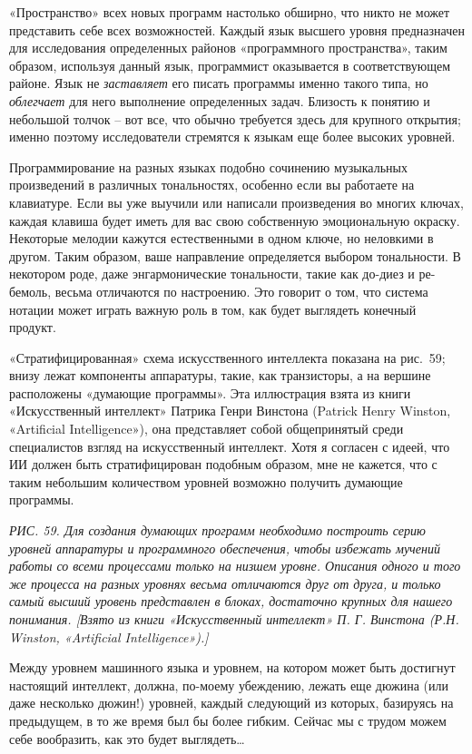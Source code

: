 \documentclass[../main.tex]{subfiles}
\begin{document}
«Пространство» всех новых программ настолько обширно, что никто не может представить себе всех возможностей. Каждый язык высшего уровня предназначен для исследования определенных районов «программного пространства», таким образом, используя данный язык, программист оказывается в соответствующем районе. Язык не \emph{заставляет} его писать программы именно такого типа, но \emph{облегчает} для него выполнение определенных задач. Близость к понятию и небольшой толчок \--- вот все, что обычно требуется здесь для крупного открытия; именно поэтому исследователи стремятся к языкам еще более высоких уровней.

Программирование на разных языках подобно сочинению музыкальных произведений в различных тональностях, особенно если вы работаете на клавиатуре. Если вы уже выучили или написали произведения во многих ключах, каждая клавиша будет иметь для вас свою собственную эмоциональную окраску. Некоторые мелодии кажутся естественными в одном ключе, но неловкими в другом. Таким образом, ваше направление определяется выбором тональности. В некотором роде, даже энгармонические тональности, такие как до-диез и ре-бемоль, весьма отличаются по настроению. Это говорит о том, что система нотации может играть важную роль в том, как будет выглядеть конечный продукт.

«Стратифицированная» схема искусственного интеллекта показана на рис.~59; внизу лежат компоненты аппаратуры, такие, как транзисторы, а на вершине расположены «думающие программы». Эта иллюстрация взята из книги «Искусственный интеллект» Патрика Генри Винстона (Patrick Henry Winston, «Artificial Intelligence»), она представляет собой общепринятый среди специалистов взгляд на искусственный интеллект. Хотя я согласен с идеей, что ИИ должен быть стратифицирован подобным образом, мне не кажется, что с таким небольшим количеством уровней возможно получить думающие программы.

\emph{РИС. 59. Для создания думающих программ необходимо построить серию уровней аппаратуры и программного обеспечения, чтобы избежать мучений работы со всеми процессами только на низшем уровне. Описания одного и того же процесса на разных уровнях весьма отличаются друг от друга, и только самый высший уровень представлен в блоках, достаточно крупных для нашего понимания. {[}Взято из книги «Искусственный интеллект» П. Г. Винстона (Р.Н. Winston, «Artificial Intelligence»).{]}}

Между уровнем машинного языка и уровнем, на котором может быть достигнут настоящий интеллект, должна, по-моему убеждению, лежать еще дюжина (или даже несколько дюжин!) уровней, каждый следующий из которых, базируясь на предыдущем, в то же время был бы более гибким. Сейчас мы с трудом можем себе вообразить, как это будет выглядеть\ldots{}
\end{document}
